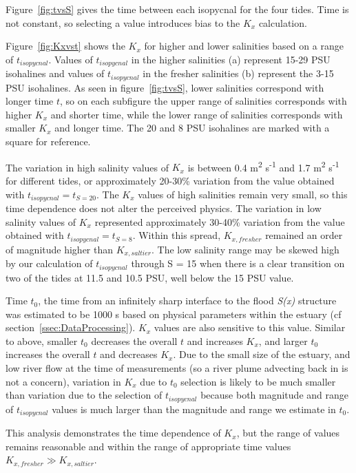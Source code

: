 Figure~\ref{fig:tvsS} gives the time between each isopycnal for the four tides. Time is not constant, so selecting a value introduces bias to the $K_x$ calculation.

Figure~\ref{fig:Kxvst} shows the $K_x$ for higher and lower salinities based on a range of $t_{isopycnal}$. Values of $t_{isopycnal}$ in the higher salinities (a) represent 15-29 PSU isohalines and values of $t_{isopycnal}$ in the fresher salinities (b) represent the 3-15 PSU isohalines. As seen in figure~\ref{fig:tvsS}, lower salinities correspond with longer time $t$, so on each subfigure the upper range of salinities corresponds with higher $K_x$ and shorter time, while the lower range of salinities corresponds with smaller $K_x$ and longer time. The 20 and 8 PSU isohalines are marked with a square for reference.

The variation in high salinity values of $K_x$ is between 0.4 m\textsuperscript{2} s\textsuperscript{-1} and 1.7 m\textsuperscript{2} s\textsuperscript{-1} for different tides, or approximately 20-30\% variation from the value obtained with $t_{isopycnal}=t_{S=20}$. The $K_x$ values of high salinities remain very small, so this time dependence does not alter the perceived physics. The variation in low salinity values of $K_x$ represented approximately 30-40\% variation from the value obtained with $t_{isopycnal}=t_{S=8}$. Within this spread, $K_{x,fresher}$ remained an order of magnitude higher than $K_{x,saltier}$. The low salinity range may be skewed high by our calculation of $t_{isopycnal}$ through S = 15 when there is a clear transition on two of the tides at 11.5 and 10.5 PSU, well below the 15 PSU value. 

Time $t_0$, the time from an infinitely sharp interface to the flood \emph{S(x)} structure was estimated to be 1000 s based on physical parameters within the estuary (cf section~\ref{ssec:DataProcessing}). $K_x$ values are also sensitive to this value. Similar to above, smaller $t_0$ decreases the overall $t$ and increases $K_x$, and larger $t_0$ increases the overall $t$ and decreases $K_x$. Due to the small size of the estuary, and low river flow at the time of measurements (so a river plume advecting back in is not a concern), variation in $K_x$ due to $t_0$ selection is likely to be much smaller than variation due to the selection of $t_{isopycnal}$ because both magnitude and range of $t_{isopycnal}$ values is much larger than the magnitude and range we estimate in  $t_0$.

This analysis demonstrates the time dependence of $K_x$, but the range of values remains reasonable and within the range of appropriate time values $K_{x,fresher}\gg K_{x,saltier}$. 

